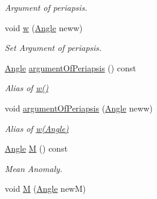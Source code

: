 \begin{DoxyCompactItemize}
\begin{DoxyCompactList}\small\item\em Argument of periapsis. \end{DoxyCompactList}\item 
\hypertarget{class_orbit3_d_a6b89ee575430b0eaf7b7b53409c2808e}{void \hyperlink{class_orbit3_d_a6b89ee575430b0eaf7b7b53409c2808e}{w} (\hyperlink{class_angle}{Angle} neww)}\label{class_orbit3_d_a6b89ee575430b0eaf7b7b53409c2808e}

\begin{DoxyCompactList}\small\item\em Set Argument of periapsis. \end{DoxyCompactList}\item 
\hypertarget{class_orbit3_d_ae22e874a67bdb3e460266605c708f703}{\hyperlink{class_angle}{Angle} \hyperlink{class_orbit3_d_ae22e874a67bdb3e460266605c708f703}{argument\+Of\+Periapsis} () const }\label{class_orbit3_d_ae22e874a67bdb3e460266605c708f703}

\begin{DoxyCompactList}\small\item\em Alias of \hyperlink{class_orbit3_d_a772447fa58a0b5e36ae0d5dbd0bd62b5}{w()} \end{DoxyCompactList}\item 
\hypertarget{class_orbit3_d_a022c24e031b1f81261673b055ab4f320}{void \hyperlink{class_orbit3_d_a022c24e031b1f81261673b055ab4f320}{argument\+Of\+Periapsis} (\hyperlink{class_angle}{Angle} neww)}\label{class_orbit3_d_a022c24e031b1f81261673b055ab4f320}

\begin{DoxyCompactList}\small\item\em Alias of \hyperlink{class_orbit3_d_a6b89ee575430b0eaf7b7b53409c2808e}{w(\+Angle)} \end{DoxyCompactList}\item 
\hypertarget{class_orbit3_d_ac6eb0ccc3e3422d88210d0f4c8d56250}{\hyperlink{class_angle}{Angle} \hyperlink{class_orbit3_d_ac6eb0ccc3e3422d88210d0f4c8d56250}{M} () const }\label{class_orbit3_d_ac6eb0ccc3e3422d88210d0f4c8d56250}

\begin{DoxyCompactList}\small\item\em Mean Anomaly. \end{DoxyCompactList}\item 
\hypertarget{class_orbit3_d_abf5cf8df54ccd9fb475e9565ea2b422c}{void \hyperlink{class_orbit3_d_abf5cf8df54ccd9fb475e9565ea2b422c}{M} (\hyperlink{class_angle}{Angle} new\+M)}\label{class_orbit3_d_abf5cf8df54ccd9fb475e9565ea2b422c}


\end{DoxyCompactItemize}
